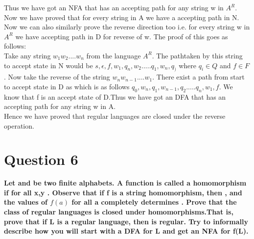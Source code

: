 \documentclass{article}
\begin{document}
  Thus we have got an NFA that has an accepting path for any string w in $A^R$.\\
Now we have proved that for every string in A we have a accepting path in N. Now we can also similarly prove the reverse 
direction too i.e. for every string w in $A^R$ we have accepting path in D for reverse of w. The proof of this goes as 
follows:\\ Take any string $w_1 w_2....w_n$ from the language $A^R$. The pathtaken by this string to accept state in N 
would be $s,\epsilon,f,w_1,q_n,w_2.....q_1,w_n,q_)$ where $q_i\in Q$ and $f\in F$. Now take the reverse of the string $w_n 
w_{n-1}....w_1$. There exist a path from start to accept state in D as which is as follows $q_0,w_n,q_1,w_{n-1},q_2.....q_n,w_1,
f$. We know that f is an accept state of D.Thus we have got an DFA that has an accepting path for any string w in A.\\
Hence we have proved that regular languages are closed under the reverse operation. 


\pagebreak
\section{Question 6}

\textbf{Let \boldsymbol{$\Sigma$} and \boldsymbol{$\Gamma$} be two finite alphabets. A function is called a homomorphism if
for all x,y . Observe that if f is a string homomorphism, then
, and the values of $f(a)$ for all a \boldsymbol{$\in \Sigma$} completely determines . Prove that the class of
regular languages is closed under homomorphisms.That is, prove that if L \boldsymbol{$\subseteq \Sigma^{*} $} is a regular
language, then  is regular. Try to informally describe how you
will start with a DFA for L and get an NFA for f(L).
}
\end{document}
